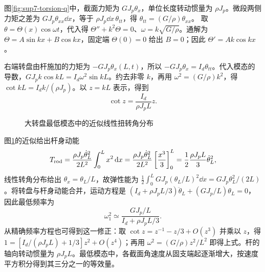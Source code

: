 \begin{solution}
图\ref{fig:sup7-torsion-q}中，截面力矩为 $GJ_p\theta_x$，单位长度转动惯量为 $\rho J_p$。微段两侧力矩之差为 $GJ_p\theta_{xx}\dd x$，等于 $\rho J_p\dd x\,\theta_{tt}$，得 $\theta_{tt}=(G/\rho)\theta_{xx}$。
取 $\theta=\Theta(x)\cos\omega t$，代入得 $\Theta''+k^2\Theta=0$、$\omega=k\sqrt{G/\rho}$。通解为 $\Theta=A\sin kx+B\cos kx$，固定端 $\Theta(0)=0$ 给出 $B=0$；因此 $\Theta'=Ak\cos kx$。

右端转盘由杆施加的力矩为 $-GJ_p\theta_x(L,t)$，所以 $-GJ_p\theta_x=I_d\theta_{tt}$。代入模态的导数，$GJ_pk\cos kL=I_d\omega^2\sin kL$。约去非零 $k$，再用 $\omega^2=(G/\rho)k^2$，得 $\cot kL=I_dk/(\rho J_p)$。以 $z=kL$ 表示，得到
\[
 \cot z=\frac{I_d}{\rho J_pL}z.
\]
\begin{figure}[H]\centering
{}
\caption{大转盘最低模态中的近似线性扭转角分布}\label{fig:sup7-torsion-s}
\end{figure}
图\ref{fig:sup7-torsion-s}的近似给出杆身动能
\[
 T_{\rm rod}=\frac{\rho J_p\dot\theta_L^2}{2L^2}\int_0^Lx^2\mathop{}\!\mathrm d x
 =\frac{\rho J_p\dot\theta_L^2}{2L^2}\left[\frac{x^3}{3}\right]_0^L
 =\frac12\frac{\rho J_pL}{3}\dot\theta_L^2,
\]
线性转角分布给出 $\theta_x=\theta_L/L$，故弹性能为 $\tfrac12\int_0^LGJ_p(\theta_L/L)^2\dd x=GJ_p\theta_L^2/(2L)$。将转盘与杆身动能合并，运动方程是 $(I_d+\rho J_pL/3)\ddot\theta_L+(GJ_p/L)\theta_L=0$，因此最低频率为
\[
 \omega_1^2\simeq\frac{GJ_p/L}{I_d+\rho J_pL/3}.
\]
从精确频率方程也可得到这一修正：取 $\cot z=z^{-1}-z/3+O(z^3)$ 并乘以 $z$，得 $1=[I_d/(\rho J_pL)+1/3]z^2+O(z^4)$；再用 $\omega^2=(G/\rho)z^2/L^2$ 即得上式。杆的轴向转动惯量为 $\rho J_pL$。最低模态中，各截面角速度从固支端起逐渐增大，按速度平方积分得到其三分之一的等效量。
\end{solution}


